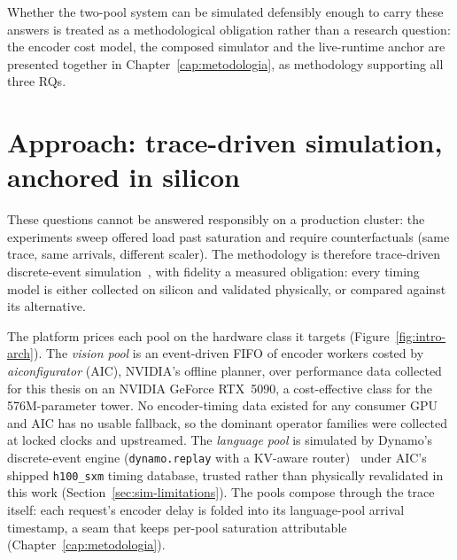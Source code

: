 Whether the two-pool system can be simulated defensibly enough to carry
these answers is treated as a methodological obligation rather than a
research question: the encoder cost model, the composed simulator and
the live-runtime anchor are presented together in
Chapter~\ref{cap:metodologia}, as methodology supporting all three RQs.

{\renewcommand{\sectionmark}[1]{}%
\section[Approach: trace-driven simulation, anchored in
silicon]{Approach: trace-driven simulation,\protect\\ anchored in silicon}%
\label{sec:intro-approach}}

These questions cannot be answered responsibly on a production cluster: the
experiments sweep offered load past saturation and require counterfactuals
(same trace, same arrivals, different scaler). The methodology is therefore
trace-driven discrete-event simulation~\cite{Agrawal2024Vidur}, with
fidelity a measured obligation: every timing model is either collected on
silicon and validated physically, or compared against its alternative.

The platform prices each pool on the hardware class it targets
(Figure~\ref{fig:intro-arch}). The \emph{vision pool} is an event-driven
FIFO of encoder workers costed by \textit{aiconfigurator} (AIC), NVIDIA's
offline planner, over performance data collected for this thesis on an
NVIDIA GeForce RTX~5090, a cost-effective class for the 576M-parameter
tower. No encoder-timing data existed for any consumer GPU and AIC has no
usable fallback, so the dominant operator families were collected at locked
clocks and upstreamed. The \emph{language pool} is simulated by Dynamo's
discrete-event engine (\texttt{dynamo.replay} with a KV-aware
router)~\cite{Dynamo2025} under AIC's shipped \texttt{h100\_sxm} timing
database, trusted rather than physically revalidated in this work
(Section~\ref{sec:sim-limitations}). The pools
compose through the trace itself: each request's encoder delay is folded
into its language-pool arrival timestamp, a seam that keeps per-pool
saturation attributable (Chapter~\ref{cap:metodologia}).

